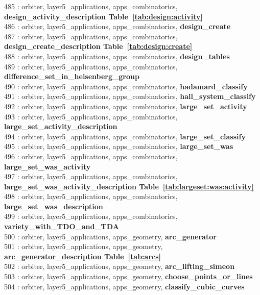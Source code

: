 485 : orbiter, layer5\_applications, apps\_combinatorics, {\bf design\_activity\_description Table~\ref{tab:design:activity}}\\
486 : orbiter, layer5\_applications, apps\_combinatorics, {\bf design\_create}\\
487 : orbiter, layer5\_applications, apps\_combinatorics, {\bf design\_create\_description Table~\ref{tab:design:create}}\\
488 : orbiter, layer5\_applications, apps\_combinatorics, {\bf design\_tables}\\
489 : orbiter, layer5\_applications, apps\_combinatorics, {\bf difference\_set\_in\_heisenberg\_group}\\
490 : orbiter, layer5\_applications, apps\_combinatorics, {\bf hadamard\_classify}\\
491 : orbiter, layer5\_applications, apps\_combinatorics, {\bf hall\_system\_classify}\\
492 : orbiter, layer5\_applications, apps\_combinatorics, {\bf large\_set\_activity}\\
493 : orbiter, layer5\_applications, apps\_combinatorics, {\bf large\_set\_activity\_description}\\
494 : orbiter, layer5\_applications, apps\_combinatorics, {\bf large\_set\_classify}\\
495 : orbiter, layer5\_applications, apps\_combinatorics, {\bf large\_set\_was}\\
496 : orbiter, layer5\_applications, apps\_combinatorics, {\bf large\_set\_was\_activity}\\
497 : orbiter, layer5\_applications, apps\_combinatorics, {\bf large\_set\_was\_activity\_description Table~\ref{tab:largeset:was:activity}}\\
498 : orbiter, layer5\_applications, apps\_combinatorics, {\bf large\_set\_was\_description}\\
499 : orbiter, layer5\_applications, apps\_combinatorics, {\bf variety\_with\_TDO\_and\_TDA}\\
500 : orbiter, layer5\_applications, apps\_geometry, {\bf arc\_generator}\\
501 : orbiter, layer5\_applications, apps\_geometry, {\bf arc\_generator\_description Table~\ref{tab:arcs}}\\
502 : orbiter, layer5\_applications, apps\_geometry, {\bf arc\_lifting\_simeon}\\
503 : orbiter, layer5\_applications, apps\_geometry, {\bf choose\_points\_or\_lines}\\
504 : orbiter, layer5\_applications, apps\_geometry, {\bf classify\_cubic\_curves}\\
